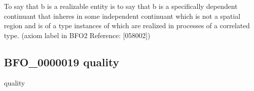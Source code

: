 \documentclass[letterpaper,10pt,english]{sphinxmanual}
\begin{document}
\begin{sphinxShadowBox}

\sphinxAtStartPar
{\hyperref[\detokenize{doc-BFO_0000020::doc}]{}}
\end{sphinxShadowBox}

\begin{sphinxShadowBox}

\sphinxAtStartPar
To say that b is a realizable entity is to say that b is a specifically dependent continuant that inheres in some independent continuant which is not a spatial region and is of a type instances of which are realized in processes of a correlated type. (axiom label in BFO2 Reference: {[}058\sphinxhyphen{}002{]})
\end{sphinxShadowBox}

\begin{sphinxShadowBox}

\sphinxAtStartPar
{}
\end{sphinxShadowBox}
\begin{quote}

\ignorespaces \end{quote}


\subsection{BFO\_0000019 \sphinxhyphen{} quality}
\label{\detokenize{doc-BFO_0000019:bfo-0000019-quality}}\label{\detokenize{doc-BFO_0000019:index-0}}\label{\detokenize{doc-BFO_0000019::doc}}
\begin{sphinxShadowBox}

\sphinxAtStartPar
quality
\end{sphinxShadowBox}

\begin{sphinxShadowBox}

\sphinxAtStartPar
{\hyperref[\detokenize{doc-BFO_0000017::doc}]{}}
\end{sphinxShadowBox}
\end{document}
